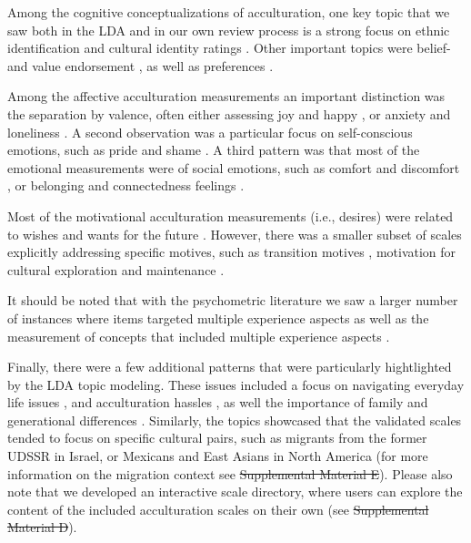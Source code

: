 \documentclass[man, 12pt, a4paper, mask]{apa7}
\newcommand{\sidirectory}{Supplemental Material C} %
\newcommand{\sicontext}{Supplemental Material D} %
\providecommand{\DIFaddtex}[1]{{\protect\color{blue}\uwave{#1}}} %
\providecommand{\DIFdeltex}[1]{{\protect\color{red}\sout{#1}}}                      %
\providecommand{\DIFaddbegin}{} %
\providecommand{\DIFaddend}{} %
\providecommand{\DIFdelbegin}{} %
\providecommand{\DIFdelend}{} %
\providecommand{\DIFadd}[1]{\texorpdfstring{\DIFaddtex{#1}}{#1}} %
\providecommand{\DIFdel}[1]{\texorpdfstring{\DIFdeltex{#1}}{}} %
\newcommand{\DIFscaledelfig}{0.5}
\newlength{\DIFdelgraphicswidth} %
\newlength{\DIFdelgraphicsheight} %
\newcommand{\DIFaddincludegraphics}[2][]{{\color{blue}\fbox{\DIFOincludegraphics[#1]{#2}}}} %
\newcommand{\DIFdelincludegraphics}[2][]{%
\sbox{\DIFdelgraphicsbox}{\DIFOincludegraphics[#1]{#2}}%
\settoboxwidth{\DIFdelgraphicswidth}{\DIFdelgraphicsbox} %
\settoboxtotalheight{\DIFdelgraphicsheight}{\DIFdelgraphicsbox} %
\scalebox{\DIFscaledelfig}{%
\parbox[b]{\DIFdelgraphicswidth}{\usebox{\DIFdelgraphicsbox}\\[-\baselineskip] \rule{\DIFdelgraphicswidth}{0em}}\llap{\resizebox{\DIFdelgraphicswidth}{\DIFdelgraphicsheight}{%
\setlength{\unitlength}{\DIFdelgraphicswidth}%
\begin{picture}(1,1)%
\thicklines\linethickness{2pt} %
{\color[rgb]{1,0,0}\put(0,0){\framebox(1,1){}}}%
{\color[rgb]{1,0,0}\put(0,0){\line( 1,1){1}}}%
{\color[rgb]{1,0,0}\put(0,1){\line(1,-1){1}}}%
\end{picture}%
}\hspace*{3pt}}} %
} %
\DeclareRobustCommand{\DIFaddbegin}{\DIFOaddbegin \let\includegraphics\DIFaddincludegraphics} %
\DeclareRobustCommand{\DIFaddend}{\DIFOaddend \let\includegraphics\DIFOincludegraphics} %
\DeclareRobustCommand{\DIFdelbegin}{\DIFOdelbegin \let\includegraphics\DIFdelincludegraphics} %
\DeclareRobustCommand{\DIFdelend}{\DIFOaddend \let\includegraphics\DIFOincludegraphics} %
\begin{document}
Among the cognitive conceptualizations of acculturation, one key topic
that we saw both in the LDA and in our own review process is a strong
focus on ethnic identification and cultural identity ratings
\citep[e.g.,][]{Jadalla2015, Mchitarjan2015}. Other important topics
were belief- \citep[e.g.,][]{Klonoff2000} and value endorsement
\citep[e.g.,][]{Kim2010a, Wolfe2001, Duarte2020}, as well as preferences
\citep[e.g.,][]{BenetMartinez2006, Tull2003}.

Among the affective acculturation measurements an important distinction
was the separation by valence, often either assessing joy and happy
\citep[e.g.,][]{Phinney1992, Cuellar1995a}, or anxiety and loneliness
\citep[e.g.,][]{Shin1999, Perez2019}. A second observation was a
particular focus on self-conscious emotions, such as pride and shame
\citep[e.g.,][]{Tsai2000, Suinn1992}. A third pattern was that most of
the emotional measurements were of social emotions, such as comfort and
discomfort \citep[e.g.,][]{Stephenson2000}, or belonging and
connectedness feelings \citep[e.g.,][]{Kouli2009, Harder2018}.

Most of the motivational acculturation measurements (i.e., desires) were
related to wishes and wants for the future
\citep[e.g.,][]{Mancini2014, Ben-Shalom2003}. However, there was a
smaller subset of scales explicitly addressing specific motives, such as
transition motives \citep[][]{Mchitarjan2015}, motivation for cultural
exploration and maintenance \citep[][]{Recker2017}.

It should be noted that with the psychometric literature we saw a larger
number of instances where items targeted multiple experience aspects
\citep[e.g., enjoyment of wearing traditional clothing,][]{Ozer2016} as
well as the measurement of concepts that included multiple experience
aspects \citep[e.g., satisfaction,][]{Cuellar1995a}.

Finally, there were a few additional patterns that were particularly
hightlighted by the LDA topic modeling. These issues included a focus on
navigating everyday life issues \citep[e.g.,][]{Harder2018}, and
acculturation hassles \citep[e.g.,][]{Vinokurov2002}, as well the
importance of family and generational differences
\citep[e.g.,][]{ICSEYteam2006, Lee2004b}. Similarly, the topics
showcased that the validated scales tended to focus on specific cultural
pairs, such as migrants from the former UDSSR in Israel, or Mexicans and
East Asians in North America (for more information on the migration
context see \DIFdelbegin \DIFdel{Supplemental Material E}\DIFdelend \DIFaddbegin \DIFadd{\sicontext}\DIFaddend ). Please also note that we developed an
interactive scale directory, where users can explore the content of the
included acculturation scales on their own (see \DIFdelbegin \DIFdel{Supplemental
Material D}\DIFdelend \DIFaddbegin \DIFadd{\sidirectory}\DIFaddend ).
\end{document}
